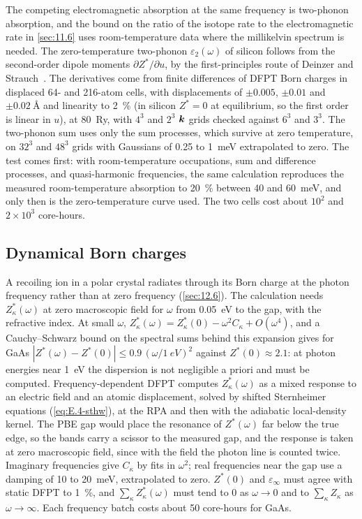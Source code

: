 The competing electromagnetic absorption at the same frequency is two-phonon absorption, and the bound on the ratio of the isotope rate to the electromagnetic rate in \cref{sec:11.6} uses room-temperature data where the millikelvin spectrum is needed. The zero-temperature two-phonon $\varepsilon_2(\omega)$ of silicon follows from the second-order dipole moments $\partial Z^*/\partial u$, by the first-principles route of Deinzer and Strauch~\cite{deinzer2004two}. The derivatives come from finite differences of DFPT Born charges in displaced 64- and 216-atom cells, with displacements of $\pm0.005$, $\pm0.01$ and $\pm\SI{0.02}{\angstrom}$ and linearity to \SI{2}{\percent} (in silicon $Z^* = 0$ at equilibrium, so the first order is linear in $u$), at \SI{80}{Ry}, with $4^3$ and $2^3$ $\bm{k}$ grids checked against $6^3$ and $3^3$. The two-phonon sum uses only the sum processes, which survive at zero temperature, on $32^3$ and $48^3$ grids with Gaussians of 0.25 to \SI{1}{meV} extrapolated to zero. The test comes first: with room-temperature occupations, sum and difference processes, and quasi-harmonic frequencies, the same calculation reproduces the measured room-temperature absorption to \SI{20}{\percent} between 40 and \SI{60}{meV}, and only then is the zero-temperature curve used. The two cells cost about $10^2$ and $2\times10^3$ core-hours.

\subsection{Dynamical Born charges}

A recoiling ion in a polar crystal radiates through its Born charge at the photon frequency rather than at zero frequency (\cref{sec:12.6}). The calculation needs $Z^*_\kappa(\omega)$ at zero macroscopic field for $\omega$ from \SI{0.05}{eV} to the gap, with the refractive index. At small $\omega$, $Z^*_\kappa(\omega) = Z^*_\kappa(0) - \omega^2C_\kappa + O(\omega^4)$, and a Cauchy--Schwarz bound on the spectral sums behind this expansion gives for GaAs $|Z^*(\omega) - Z^*(0)| \le 0.9\,(\omega/\SI{1}{eV})^2$ against $Z^*(0) \approx 2.1$: at photon energies near \SI{1}{eV} the dispersion is not negligible a priori and must be computed. Frequency-dependent DFPT computes $Z^*_\kappa(\omega)$ as a mixed response to an electric field and an atomic displacement, solved by shifted Sternheimer equations (\cref{eq:E.4-sthw}), at the RPA and then with the adiabatic local-density kernel. The PBE gap would place the resonance of $Z^*(\omega)$ far below the true edge, so the bands carry a scissor to the measured gap, and the response is taken at zero macroscopic field, since with the field the photon line is counted twice. Imaginary frequencies give $C_\kappa$ by fits in $\omega^2$; real frequencies near the gap use a damping of 10 to \SI{20}{meV}, extrapolated to zero. $Z^*(0)$ and $\varepsilon_\infty$ must agree with static DFPT to \SI{1}{\percent}, and $\sum_\kappa Z^*_\kappa(\omega)$ must tend to 0 as $\omega\to0$ and to $\sum_\kappa Z_\kappa$ as $\omega\to\infty$. Each frequency batch costs about 50 core-hours for GaAs.

